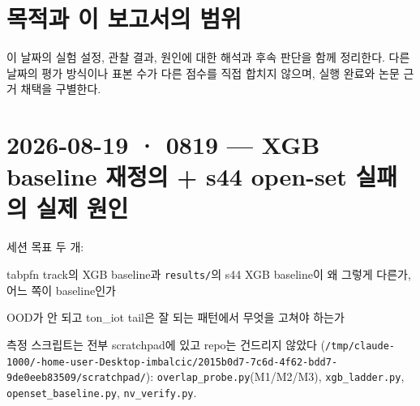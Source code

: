 




\section*{목적과 이 보고서의 범위}

이 날짜의 실험 설정, 관찰 결과, 원인에 대한 해석과 후속 판단을 함께 정리한다. 다른 날짜의 평가 방식이나 표본 수가 다른 점수를 직접 합치지 않으며, 실행 완료와 논문 근거 채택을 구별한다.


\section{2026-08-19 · 0819 — XGB baseline 재정의 +\allowbreak{} s44 open-set 실패의 실제 원인}
\label{report:20260819_0819}
세션 목표 두 개:

\par\noindent \textbullet\enspace tabpfn track의 XGB baseline과 \texttt{results/\allowbreak{}\allowbreak{}}의 s44 XGB baseline이 왜 그렇게 다른가, 어느 쪽이 baseline인가


\par\noindent \textbullet\enspace OOD가 안 되고 ton\_\allowbreak{}iot tail은 잘 되는 패턴에서 무엇을 고쳐야 하는가


측정 스크립트는 전부 scratchpad에 있고 repo는 건드리지 않았다 (\texttt{/\allowbreak{}\allowbreak{}tmp/\allowbreak{}\allowbreak{}cla\allowbreak{}ude-\allowbreak{}1000\allowbreak{}/\allowbreak{}\allowbreak{}-\allowbreak{}home-\allowbreak{}u\allowbreak{}ser-\allowbreak{}Desk\allowbreak{}top-\allowbreak{}imba\allowbreak{}lcic/\allowbreak{}\allowbreak{}201\allowbreak{}5b0d7-\allowbreak{}7c\allowbreak{}6d-\allowbreak{}4f62-\allowbreak{}bdd7-\allowbreak{}9de\allowbreak{}0eeb8350\allowbreak{}9/\allowbreak{}\allowbreak{}scratc\allowbreak{}hpad/\allowbreak{}\allowbreak{}}): \texttt{overlap\_\allowbreak{}\allowbreak{}probe.\allowbreak{}py\allowbreak{}}(M1/\allowbreak{}M2/\allowbreak{}M3), \texttt{xgb\_\allowbreak{}\allowbreak{}ladd\allowbreak{}er.\allowbreak{}py}, \texttt{openset\_\allowbreak{}\allowbreak{}baseline\allowbreak{}.\allowbreak{}py}, \texttt{nv\_\allowbreak{}\allowbreak{}verif\allowbreak{}y.\allowbreak{}py}.


